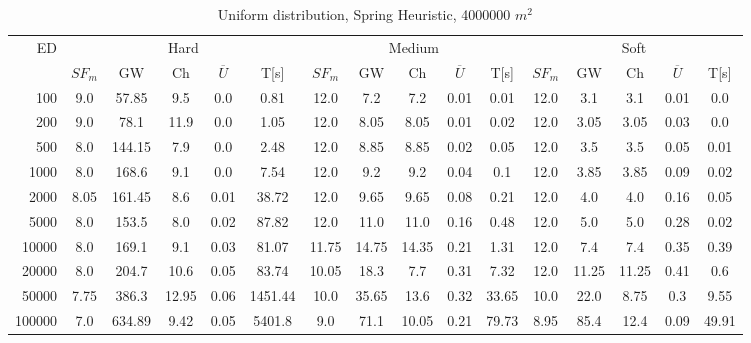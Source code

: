 \begin{table}[htb]
	\centering
	\begin{tabular}{|r|c|c|c|c|c|c|c|c|c|c|c|c|c|c|c|} 
		\multirow{2}{*}{ED} & \multicolumn{5}{c|}{Hard} & \multicolumn{5}{c|}{Medium} &\multicolumn{5}{c|}{Soft} \\ 
		\cline{2-16} 
		&$SF_{m}$&GW & Ch & $\overline{U}$&T[s] &$SF_{m}$&GW & Ch & $\overline{U}$ &T[s] &$SF_{m}$&GW & Ch & $\overline{U}$  & T[s]  \\ 
		\hline 
		100 & 9.0 & 57.85 & 9.5 & 0.0 & 0.81 & 12.0 & 7.2 & 7.2 & 0.01 & 0.01 & 12.0 & 3.1 & 3.1 & 0.01 & 0.0\\ 
		200 & 9.0 & 78.1 & 11.9 & 0.0 & 1.05 & 12.0 & 8.05 & 8.05 & 0.01 & 0.02 & 12.0 & 3.05 & 3.05 & 0.03 & 0.0\\ 
		500 & 8.0 & 144.15 & 7.9 & 0.0 & 2.48 & 12.0 & 8.85 & 8.85 & 0.02 & 0.05 & 12.0 & 3.5 & 3.5 & 0.05 & 0.01\\ 
		1000 & 8.0 & 168.6 & 9.1 & 0.0 & 7.54 & 12.0 & 9.2 & 9.2 & 0.04 & 0.1 & 12.0 & 3.85 & 3.85 & 0.09 & 0.02\\ 
		2000 & 8.05 & 161.45 & 8.6 & 0.01 & 38.72 & 12.0 & 9.65 & 9.65 & 0.08 & 0.21 & 12.0 & 4.0 & 4.0 & 0.16 & 0.05\\ 
		5000 & 8.0 & 153.5 & 8.0 & 0.02 & 87.82 & 12.0 & 11.0 & 11.0 & 0.16 & 0.48 & 12.0 & 5.0 & 5.0 & 0.28 & 0.02\\ 
		10000 & 8.0 & 169.1 & 9.1 & 0.03 & 81.07 & 11.75 & 14.75 & 14.35 & 0.21 & 1.31 & 12.0 & 7.4 & 7.4 & 0.35 & 0.39\\ 
		20000 & 8.0 & 204.7 & 10.6 & 0.05 & 83.74 & 10.05 & 18.3 & 7.7 & 0.31 & 7.32 & 12.0 & 11.25 & 11.25 & 0.41 & 0.6\\ 
		50000 & 7.75 & 386.3 & 12.95 & 0.06 & 1451.44 & 10.0 & 35.65 & 13.6 & 0.32 & 33.65 & 10.0 & 22.0 & 8.75 & 0.3 & 9.55\\ 
		100000 & 7.0 & 634.89 & 9.42 & 0.05 & 5401.8 & 9.0 & 71.1 & 10.05 & 0.21 & 79.73 & 8.95 & 85.4 & 12.4 & 0.09 & 49.91\\ 
		\hline 
	\end{tabular} 
	\caption{Uniform distribution, Spring Heuristic, 4000000 $m^2$} 
	\label{tab:UnSprings2000} 
\end{table} 
